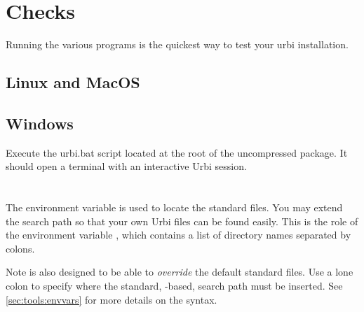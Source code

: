 \section{Checks}

Running the various programs is the quickest way to test your urbi
installation.

\subsection{Linux and MacOS}


\subsection{Windows}

Execute the urbi.bat script located at the root of the uncompressed
package. It should open a terminal with an interactive Urbi session.


\section{}

The environment variable  is used to locate the \us
standard files.  You may extend the search path so that your own Urbi
files can be found easily.  This is the role of the environment
variable ,
which contains a list of directory names separated by colons.

Note  is also designed to be able to \emph{override}
the default standard files.  Use a lone colon to specify where the
standard, -based, search path must be inserted.  See
\autoref{sec:tools:envvars} for more details on the syntax.

